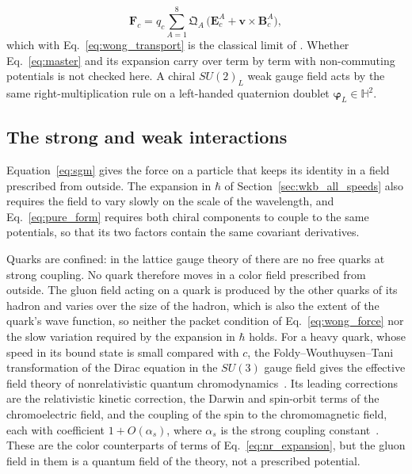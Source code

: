 \documentclass[aps,prd,onecolumn,tightenlines,nofootinbib,notitlepage,11pt,floatfix]{revtex4-2}
\theoremstyle{indentedtheorem}
\begin{document}
\begin{equation}
    \mathbf{F}_c = q_c\sum_{A=1}^8 \mathfrak{Q}_A\,\big(\mathbf{E}_c^A + \mathbf{v}\times\mathbf{B}_c^A\big) ,
    \label{eq:wong_force}
\end{equation}
which with Eq.~\eqref{eq:wong_transport} is the classical limit of \citet{Wong1970Field}. Whether Eq.~\eqref{eq:master} and its expansion carry over term by term with non-commuting potentials is not checked here. A chiral $SU(2)_L$ weak gauge field acts by the same right-multiplication rule on a left-handed quaternion doublet $\boldsymbol{\varphi}_L\in\mathbb{H}^2$.

\subsection{The strong and weak interactions}
\label{sec:strong_weak}

Equation~\eqref{eq:sgm} gives the force on a particle that keeps its identity in a field prescribed from outside. The expansion in $\hbar$ of Section~\ref{sec:wkb_all_speeds} also requires the field to vary slowly on the scale of the wavelength, and Eq.~\eqref{eq:pure_form} requires both chiral components to couple to the same potentials, so that its two factors contain the same covariant derivatives.

Quarks are confined: in the lattice gauge theory of \citet{Wilson1974Confinement} there are no free quarks at strong coupling. No quark therefore moves in a color field prescribed from outside. The gluon field acting on a quark is produced by the other quarks of its hadron and varies over the size of the hadron, which is also the extent of the quark's wave function, so neither the packet condition of Eq.~\eqref{eq:wong_force} nor the slow variation required by the expansion in $\hbar$ holds. For a heavy quark, whose speed in its bound state is small compared with $c$, the Foldy--Wouthuysen--Tani transformation of the Dirac equation in the $SU(3)$ gauge field gives the effective field theory of nonrelativistic quantum chromodynamics~\citep{CaswellLepage1986Effective,BodwinBraatenLepage1995Rigorous}. Its leading corrections are the relativistic kinetic correction, the Darwin and spin-orbit terms of the chromoelectric field, and the coupling of the spin to the chromomagnetic field, each with coefficient $1+O(\alpha_s)$, where $\alpha_s$ is the strong coupling constant~\citep{BodwinBraatenLepage1995Rigorous}. These are the color counterparts of terms of Eq.~\eqref{eq:nr_expansion}, but the gluon field in them is a quantum field of the theory, not a prescribed potential.
\end{document}
